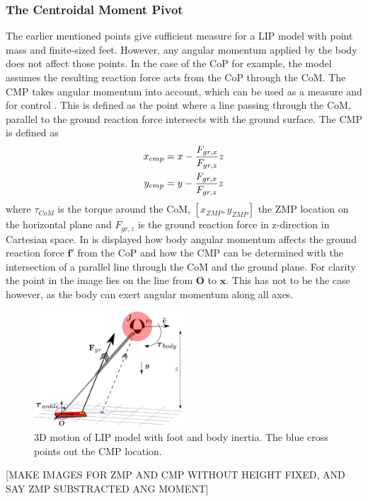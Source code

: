 \subsubsection{The Centroidal Moment Pivot}
The earlier mentioned points give sufficient measure for a \ac{LIP} model with point mass and finite-sized feet. However, any angular momentum applied by the body does not affect those points. In the case of the \ac{CoP} for example, the model assumes the resulting reaction force acts from the \ac{CoP} through the \ac{CoM}. The \ac{CMP} takes angular momentum into account, which can be used as a measure and for control \cite{popovic2005ground}. This is defined as the point where a line passing through the \ac{CoM}, parallel to the ground reaction force intersects with the ground surface. The \ac{CMP} is defined as
\begin{align}
    x_{cmp}&=x-\frac{F_{gr,x}}{F_{gr,z}}z\\
    y_{cmp}&=y-\frac{F_{gr,x}}{F_{gr,z}}z
\end{align}
where $\tau_{CoM}$ is the torque around the \ac{CoM}, $[x_{ZMP},y_{ZMP}]$ the \ac{ZMP} location on the horizontal plane and $F_{gr,z}$ is the ground reaction force in z-direction in Cartesian space. In  is displayed how body angular momentum affects the ground reaction force $\boldsymbol{f'}$ from the \ac{CoP} and how the \ac{CMP} can be determined with the intersection of a parallel line through the \ac{CoM} and the ground plane. For clarity the point in the image lies on the line from $\boldsymbol{O}$ to $\boldsymbol{x}$. This has not to be the case however, as the body can exert angular momentum along all axes. 
\begin{figure}[h]
\centering
\includegraphics[width=0.5\textwidth]{STYLESTUFF/3DCMPCoPviz.png}
\caption{\ac{3D} motion of \ac{LIP} model with foot and body inertia. The blue cross points out the \ac{CMP} location.}
\label{fig:3dlipfootinertia}
\end{figure}
[MAKE IMAGES FOR ZMP AND CMP WITHOUT HEIGHT FIXED, AND SAY ZMP SUBSTRACTED ANG MOMENT]


